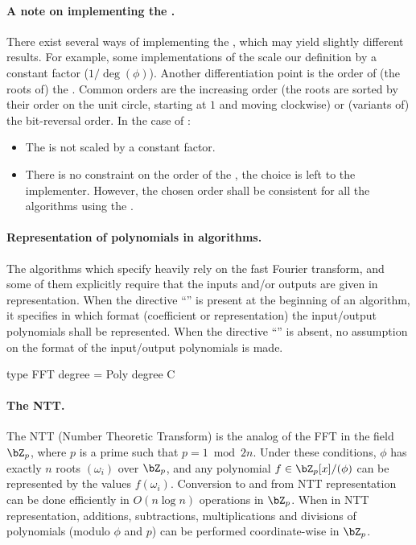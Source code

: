  \paragraph{A note on implementing the \fft.} There exist several ways of implementing the \fft, which may yield slightly different results. For example, some implementations of the \fft scale our definition by a constant factor (\eg $1/\deg(\phi)$). Another differentiation point is the order of (the roots of) the \fft. Common orders are the increasing order (\ie the roots are sorted by their order on the unit circle, starting at $1$ and moving clockwise) or (variants of) the bit-reversal order. In the case of \falcon:
 \begin{itemize}
  \item The \fft is not scaled by a constant factor.
  \item There is no constraint on the order of the \fft, the choice is left to the implementer. However, the chosen order shall be consistent for all the algorithms using the \fft.
 \end{itemize}


 \paragraph{Representation of polynomials in algorithms.} The algorithms which specify \falcon heavily rely on the fast Fourier transform, and some of them explicitly require that the inputs and/or outputs are given in \fft representation. When the directive ``\algorithmicformat'' is present at the beginning of an algorithm, it specifies in which format (coefficient or \fft representation) the input/output polynomials shall be represented. When the directive ``\algorithmicformat'' is absent, no assumption on the format of the input/output polynomials is made.

\begin{code}
  type FFT degree = Poly degree C
\end{code}

 \paragraph{The NTT.} The NTT (Number Theoretic Transform) is the analog
 of the FFT in the field $\bZ_p$, where $p$ is a prime such that $p = 1
 \bmod 2n$. Under these
 conditions, $\phi$ has exactly $n$ roots $(\omega_i)$ over $\bZ_p$, and
 any polynomial $f \in \bZ_p[x]/(\phi)$ can be represented by the values
 $f(\omega_i)$. Conversion to and from NTT representation can be done
 efficiently in $O(n \log n)$ operations in $\bZ_p$. When in NTT
 representation, additions, subtractions, multiplications and divisions
 of polynomials (modulo $\phi$ and $p$) can be performed coordinate-wise
 in $\bZ_p$.

